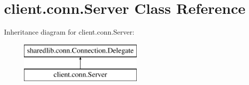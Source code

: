 \hypertarget{classclient_1_1conn_1_1_server}{}\section{client.\+conn.\+Server Class Reference}
\label{classclient_1_1conn_1_1_server}
Inheritance diagram for client.\+conn.\+Server\+:\begin{figure}[H]
\begin{center}
\leavevmode
\includegraphics[height=2.000000cm]{classclient_1_1conn_1_1_server}
\end{center}
\end{figure}

